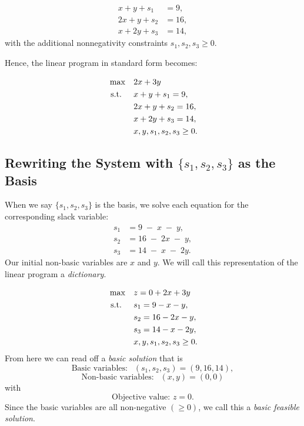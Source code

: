\[
\begin{aligned}
x + y + s_1 &= 9, \\
2x + y + s_2 &= 16, \\
x + 2y + s_3 &= 14,
\end{aligned}
\]
with the additional nonnegativity constraints \(s_1, s_2, s_3 \ge 0\). 

Hence, the linear program in standard form becomes:
\begin{tcolorbox}[
    colback=gray!5!white,
    colframe=gray!75!black,
    title=\textbf{Standard Form},
    width=0.6\textwidth, %
    box align=center
]
\[
\begin{aligned}
\max\quad 
& 2x + 3y \\
\mbox{ s.t. }\quad 
& x + y + s_1 = 9, \\
& 2x + y + s_2 = 16, \\
& x + 2y + s_3 = 14, \\
& x, y, s_1, s_2, s_3 \ge 0.
\end{aligned}
\]
\end{tcolorbox}

\subsection*{Rewriting the System with \(\{s_1,s_2,s_3\}\) as the Basis}

When we say \(\{s_1,s_2,s_3\}\) is the basis, we solve each equation for the corresponding slack variable:
\[
\begin{aligned}
s_1 &= 9 \;-\; x \;-\; y, \\[6pt]
s_2 &= 16 \;-\; 2x \;-\; y,\\[6pt]
s_3 &= 14 \;-\; x \;-\; 2y.
\end{aligned}
\]
 Our initial non-basic variables are $x$ and $y$. 
We will call this representation of the linear program a \emph{dictionary}. 
\begin{tcolorbox}[colback=blue!5!white, colframe=blue!75!black,     width=0.6\textwidth, %
    box align=center, title=\textbf{Initial Dictionary}]
\[
\begin{aligned}
\max\quad 
& z = 0 + 2x + 3y \\
\mbox{ s.t. }\quad 
& s_1 = 9 - x - y, \\
& s_2 = 16 - 2x - y, \\
& s_3 = 14 - x - 2y , \\
& x, y, s_1, s_2, s_3 \ge 0.
\end{aligned}
\]
From here we can read off a \emph{basic solution} that is 
$$
\text{Basic variables: } \ \ (s_1, s_2, s_3) = (9, 16,14),$$
$$
 \text{Non-basic variables:  } \ \ (x,y) = (0,0)
$$
with 
$$
\text{Objective value: } z = 0.
$$
Since the basic variables are all non-negative $(\geq 0)$, we call this a \emph{basic feasible solution}.
\end{tcolorbox}

